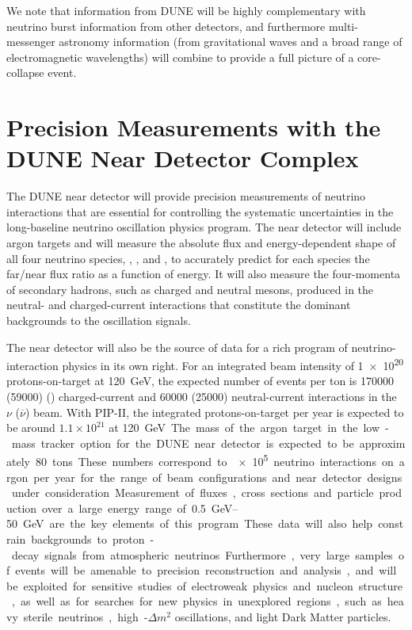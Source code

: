 We note that information from DUNE will be highly complementary with neutrino burst information from other detectors, and furthermore multi-messenger astronomy information (from gravitational waves and a broad range of electromagnetic wavelengths) will combine to provide a full picture of a core-collapse event.



\section{Precision Measurements with the DUNE Near Detector Complex}
\label{sec:exec-summ-nd-precision-physics}

The DUNE near detector
will provide precision measurements of
neutrino interactions that are essential
for controlling the systematic uncertainties in the long-baseline neutrino 
oscillation physics program.  The near detector 
will include argon targets and will measure the absolute flux and energy-dependent
shape of all four neutrino species, \numu, \anumu, \nue and \anue,
to accurately predict for each species the
far/near flux ratio as a function of energy.  It will also measure the
four-momenta of secondary hadrons, such as charged and neutral mesons,
produced in the neutral- and charged-current interactions that
constitute the dominant backgrounds to the oscillation signals.

The near detector will also be the source of data for a rich program
of neutrino-interaction physics in its own right. For an integrated
beam intensity of \num{1e20} 
protons-on-target at \SI{120}{GeV}, the expected number of events per
ton is \num{170000} (\num{59000}) 
\numu (\anumu) charged-current and \num{60000} (\num{25000}) neutral-current interactions in the $\nu$ ($\overline\nu$) beam. With PIP-II, the integrated protons-on-target per year is
  expected to be around $1.1\times 10^{21}$ at \SI{120}\GeV. The mass
  of the argon target in the low-mass tracker option for the DUNE near detector is expected to be approximately
  80 tons. 
  These numbers correspond to \num{e5} neutrino interactions
on argon per year for the range of beam configurations and near detector
designs under consideration.  Measurement of fluxes, cross sections
and particle production over a large energy range of
\SIrange{0.5}{50}{\GeV} are the key elements of this program.  These
data will also help constrain backgrounds to proton-decay signals
from atmospheric neutrinos.  Furthermore, very large samples of events
will be amenable to precision reconstruction and analysis, and will be
exploited for sensitive studies of electroweak physics and nucleon
structure, as well as for searches for new physics in unexplored
regions, such as heavy sterile neutrinos, high-$\Delta m^2$
oscillations, and light Dark Matter particles. %

